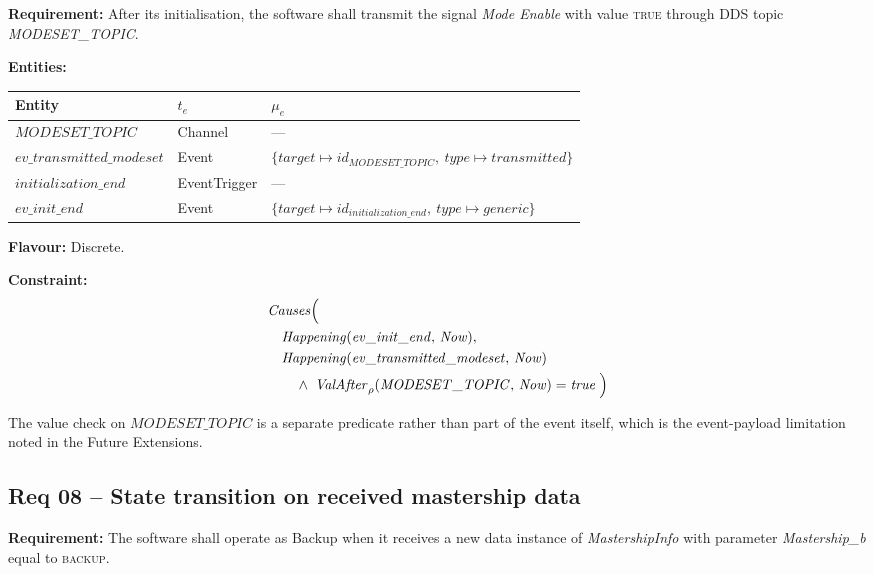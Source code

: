 \textbf{Requirement:} After its initialisation, the software shall transmit the signal \textit{Mode Enable} with value \textsc{true} through DDS topic \textit{MODESET\_TOPIC}.

\medskip
\textbf{Entities:}
\begin{center}
\begin{tabular}{lll}
    \toprule
    \textbf{Entity} & $t_e$ & $\mu_e$ \\
    \midrule
    $\mathit{MODESET\_TOPIC}$ & Channel & --- \\
    $\mathit{ev\_transmitted\_modeset}$ & Event & $\{\mathit{target} \mapsto id_{\mathit{MODESET\_TOPIC}},\ \mathit{type} \mapsto \mathit{transmitted}\}$ \\
    $\mathit{initialization\_end}$ & EventTrigger & --- \\
    $\mathit{ev\_init\_end}$ & Event & $\{\mathit{target} \mapsto id_{\mathit{initialization\_end}},\ \mathit{type} \mapsto \mathit{generic}\}$ \\
    \bottomrule
\end{tabular}
\end{center}

\textbf{Flavour:} Discrete.

\textbf{Constraint:}
\begin{align*}
    &\mathit{Causes}\Bigl( \\
    &\quad \mathit{Happening}(\mathit{ev\_init\_end},\, \mathit{Now}), \\
    &\quad \mathit{Happening}(\mathit{ev\_transmitted\_modeset},\, \mathit{Now}) \\
    &\qquad \land\; \mathit{ValAfter}_\rho(\mathit{MODESET\_TOPIC},\, \mathit{Now}) = \mathit{true}
    \;\Bigr)
\end{align*}

The value check on $\mathit{MODESET\_TOPIC}$ is a separate predicate rather than part of the event itself, which is the event-payload limitation noted in the Future Extensions.

\subsection{Req 08 -- State transition on received mastership data}

\textbf{Requirement:} The software shall operate as Backup when it receives a new data instance of \textit{MastershipInfo} with parameter \textit{Mastership\_b} equal to \textsc{backup}.


